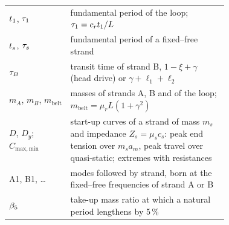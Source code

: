 \begin{table}[tp]
\begin{tabular}{@{}l>{\raggedright\arraybackslash}p{0.72\linewidth}@{}}
$t_{1}$, $\tau_{1}$ & fundamental period of the loop; $\tau_{1}=c_rt_{1}/L$\\
$t_{s}$, $\tau_{s}$ & fundamental period of a fixed--free strand\\
$\tau_B$ & transit time of strand B, $1-\xi+\gamma$ (head drive) or $\gamma+\ell_1+\ell_2$\\
$m_A$, $m_B$, $m_\mathrm{belt}$ & masses of strands A, B and of the loop; $m_\mathrm{belt}=\mu_rL(1+\gamma^2)$\\
$D$, $D_y$; $C_\mathrm{max,min}$ & start-up curves of a strand of mass $m_s$ and impedance $Z_s=\mu_sc_s$: peak end tension over $m_sa_m$, peak travel over quasi-static; extremes with resistances\\
A1, B1, \dots & modes followed by strand, born at the fixed--free frequencies of strand A or B\\
$\beta_5$ & take-up mass ratio at which a natural period lengthens by 5\,\%\\
\bottomrule
\end{tabular}
\end{table}
